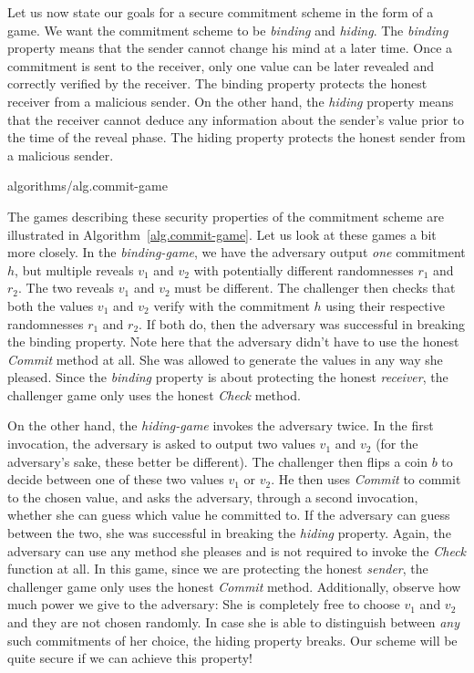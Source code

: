 Let us now state our goals for
a secure commitment scheme in the form of a game.
We want the commitment scheme to be
\emph{binding} and \emph{hiding}. The \emph{binding} property means that the sender
cannot change his mind at a later time. Once a commitment is sent to the receiver,
only one value can be later revealed and correctly verified by the receiver. The
binding property protects the honest receiver from a malicious sender. On the
other hand, the \emph{hiding} property means that the receiver cannot deduce
any information about the sender's value prior to the time of the reveal phase.
The hiding property protects the honest sender from a malicious sender.

{algorithms/alg.commit-game}

The games describing these security properties of the commitment scheme are
illustrated in Algorithm~\ref{alg.commit-game}. Let us look at these games a bit
more closely. In the \emph{binding-game}, we have the adversary output \emph{one}
commitment $h$, but multiple reveals $v_1$ and $v_2$ with potentially different
randomnesses $r_1$ and $r_2$. The two reveals $v_1$ and $v_2$ must be different.
The challenger then checks that both the values $v_1$ and $v_2$ verify with
the commitment $h$ using their respective randomnesses $r_1$ and $r_2$. If both
do, then the adversary was successful in breaking the binding property. Note here
that the adversary didn't have to use the honest \emph{Commit} method at all.
She was allowed to generate the values in any way she pleased. Since the \emph{binding}
property is about protecting the honest \emph{receiver}, the challenger game only uses
the honest \emph{Check} method.

On the other hand, the \emph{hiding-game} invokes the adversary twice. In the first
invocation, the adversary is asked to output two values $v_1$ and $v_2$ (for the
adversary's sake, these better be different). The challenger then flips a coin $b$
to decide between one of these two values $v_1$ or $v_2$. He then uses \emph{Commit}
to commit to the chosen value, and asks the adversary, through a second invocation,
whether she can guess which value he committed to. If the adversary can guess between
the two, she was successful in breaking the \emph{hiding} property. Again, the adversary
can use any method she pleases and is not required to invoke the \emph{Check} function
at all. In this game, since we are protecting the honest \emph{sender}, the challenger
game only uses the honest \emph{Commit} method. Additionally, observe how much power
we give to the adversary: She is completely free to choose $v_1$ and $v_2$ and they
are not chosen randomly. In case she is able to distinguish between \emph{any} such
commitments of her choice, the hiding property breaks. Our scheme will be quite
secure if we can achieve this property!

